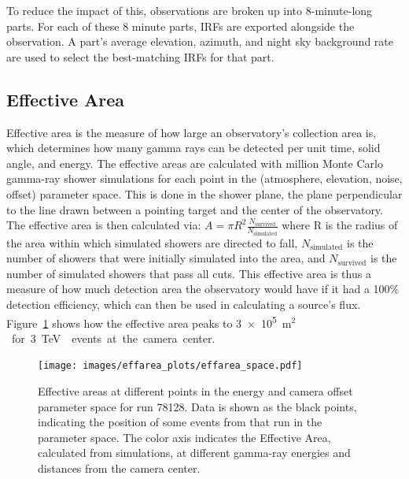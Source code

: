   To reduce the impact of this, observations are broken up into 8-minute-long parts.
  For each of these 8 minute parts, IRFs are exported alongside the observation.
  A part's average elevation, azimuth, and night sky background rate are used to select the best-matching IRFs for that part.

  \FloatBarrier
  
  \subsection{Effective Area}\label{subsec:effarea}
    Effective area is the measure of how large an observatory's collection area is, which determines how many gamma rays can be detected per unit time, solid angle, and energy.
    The effective areas are calculated with  million Monte Carlo gamma-ray shower simulations for each point in the (atmosphere, elevation, noise, offset) parameter space.
    This is done in the shower plane, the plane perpendicular to the line drawn between a pointing target and the center of the observatory.
    The effective area is then calculated via:
    $A=\pi R^2 \frac{N_{\text{survived}}}{N_{\text{simulated}}}$
    where R is the radius of the area within which simulated showers are directed to fall, $N_{\text{simulated}}$ is the number of showers that were initially simulated into the area, and $N_{\text{survived}}$ is the number of simulated showers that pass all cuts.
    This effective area is thus a measure of how much detection area the observatory would have if it had a 100\% detection efficiency, which can then be used in calculating a source's flux.
    Figure~\ref{fig:effarea_paramspace} shows how the effective area peaks to \nicetilde{}\SI{3e5}{m${}^2$} for \SI{3}{\TeV{}} events at the camera center.

    \begin{figure}[!t]
      \centering
      \texttt{[image: images/effarea\_plots/effarea\_space.pdf]}
      \caption[Effective Area Parameter Space]{
        Effective areas at different points in the energy and camera offset parameter space for run 78128.
        Data is shown as the black points, indicating the position of some events from that run in the parameter space.
        The color axis indicates the Effective Area, calculated from simulations, at different gamma-ray energies and distances from the camera center.
      }
      \label{fig:effarea_paramspace}
    \end{figure}

